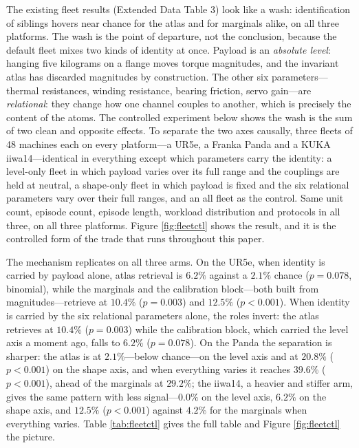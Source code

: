 \documentclass[11pt]{article}
\begin{document}
The existing fleet results (Extended Data Table 3) look like a wash:
identification of siblings hovers near chance for the atlas and for marginals
alike, on all three platforms. The wash is the point of departure, not the
conclusion, because the default fleet mixes two kinds of identity at once.
Payload is an \emph{absolute level}: hanging five kilograms on a flange moves
torque magnitudes, and the invariant atlas has discarded magnitudes by
construction. The other six parameters---thermal resistances, winding
resistance, bearing friction, servo gain---are \emph{relational}: they change
how one channel couples to another, which is precisely the content of the
atoms. The controlled experiment below shows the wash is the sum of two clean
and opposite effects. To separate the two axes causally, three
fleets of 48 machines each on every platform---a UR5e, a Franka Panda and a
KUKA iiwa14---identical in everything except which parameters carry the
identity: a level-only fleet in which payload varies over its full range and
the couplings are held at neutral, a shape-only fleet in which payload is
fixed and the six relational parameters vary over their full ranges, and an
all fleet as the control. Same unit count, episode count, episode length,
workload distribution and protocols in all three, on all three platforms.
Figure \ref{fig:fleetctl} shows the result, and it is the controlled form of
the trade that runs throughout this paper.


The mechanism replicates on all three arms. On the UR5e, when identity is
carried by payload alone, atlas retrieval is $6.2\%$ against a $2.1\%$ chance
($p = 0.078$, binomial), while the marginals and the calibration block---both
built from magnitudes---retrieve at $10.4\%$ ($p = 0.003$) and $12.5\%$
($p < 0.001$). When identity is carried by the six relational parameters
alone, the roles invert: the atlas retrieves at $10.4\%$ ($p = 0.003$) while
the calibration block, which carried the level axis a moment ago, falls to
$6.2\%$ ($p = 0.078$). On the Panda the separation is sharper: the atlas is
at $2.1\%$---below chance---on the level axis and at $20.8\%$ ($p < 0.001$)
on the shape axis, and when everything varies it reaches $39.6\%$
($p < 0.001$), ahead of the marginals at $29.2\%$; the iiwa14, a heavier and
stiffer arm, gives the same pattern with less signal---$0.0\%$ on the level
axis, $6.2\%$ on the shape axis, and $12.5\%$ ($p < 0.001$) against $4.2\%$
for the marginals when everything varies. Table \ref{tab:fleetctl} gives the
full table and Figure \ref{fig:fleetctl} the picture.
\end{document}

